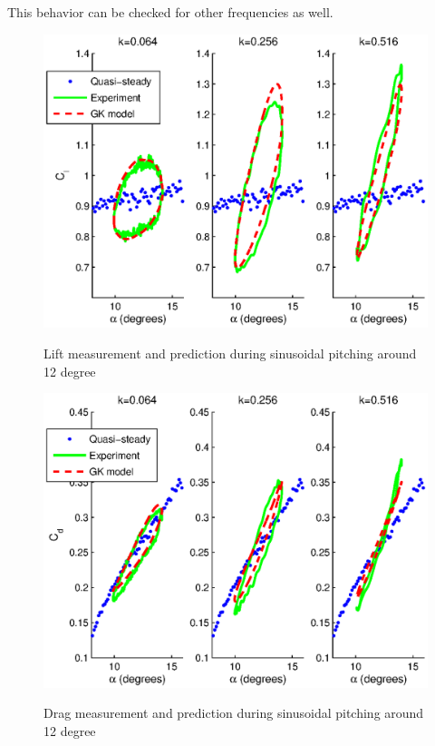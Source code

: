 \FloatBarrier

\par This behavior can be checked for other frequencies as well.

\begin{figure}[h]
  \begin{center}
    \scalebox{1}  
    {\includegraphics{./Figures/Pitching_allcases_GK_CL_12_amp_2.eps}}
  \end{center}
  \caption{Lift measurement and prediction during sinusoidal pitching around 12 degree} 
  \label{fig:Pitching_allcases_GK_Cl_12}
\end{figure}

\begin{figure}[h]
  \begin{center}
    \scalebox{1}  
    {\includegraphics{./Figures/Pitching_allcases_GK_CD_12_amp_2.eps}}
  \end{center}
  \caption{Drag measurement and prediction during sinusoidal pitching around 12 degree} 
  \label{fig:Pitching_allcases_GK_Cd_12}
\end{figure}

